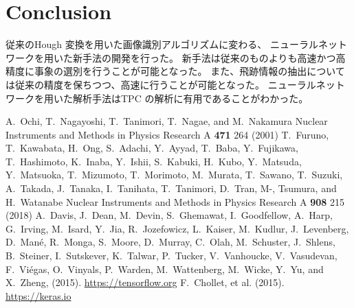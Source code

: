 \documentclass{jps-cp}
\begin{document}
\section{Conclusion}
従来のHough 変換を用いた画像識別アルゴリズムに変わる、
ニューラルネットワークを用いた新手法の開発を行った。
新手法は従来のものよりも高速かつ高精度に事象の選別を行うことが可能となった。
また、飛跡情報の抽出については従来の精度を保ちつつ、高速に行うことが可能となった。
ニューラルネットワークを用いた解析手法はTPC の解析に有用であることがわかった。

\begin{thebibliography}{9}
  A.~Ochi, T.~Nagayoshi, T.~Tanimori, T.~Nagae, and M.~Nakamura
  Nuclear Instruments and Methods in Physics Research A \textbf{471} 264 (2001)
  T.~Furuno, T.~Kawabata, H.~Ong, S.~Adachi, Y.~Ayyad, T.~Baba, Y.~Fujikawa, T.~Hashimoto, K.~Inaba, Y.~Ishii,
  S.~Kabuki, H.~Kubo, Y.~Matsuda, Y.~Matsuoka, T.~Mizumoto, T.~Morimoto, M.~Murata, T.~Sawano, T.~Suzuki, A.~Takada,
  J.~Tanaka, I.~Tanihata, T.~Tanimori, D.~Tran, M-, Tsumura, and H.~Watanabe
  Nuclear Instruments and Methods in Physics Research A \textbf{908} 215 (2018)
  A.~Davis, J.~Dean, M.~Devin, S.~Ghemawat, I.~Goodfellow, A.~Harp, G.~Irving,
  M.~Isard, Y.~Jia, R.~Jozefowicz, L.~Kaiser, M.~Kudlur, J.~Levenberg,
  D.~Man\'{e}, R.~Monga, S.~Moore, D.~Murray, C.~Olah, M.~Schuster, J.~Shlens,
  B.~Steiner, I.~Sutskever, K.~Talwar, P.~Tucker, V.~Vanhoucke, V.~Vasudevan,
  F.~Vi\'{e}gas, O.~Vinyals, P.~Warden, M.~Wattenberg, M.~Wicke, Y.~Yu, and
  X.~Zheng, (2015).
  \url{https://tensorflow.org}
  F.~Chollet, et al. (2015). \url{https://keras.io}

\end{thebibliography}
\end{document}
